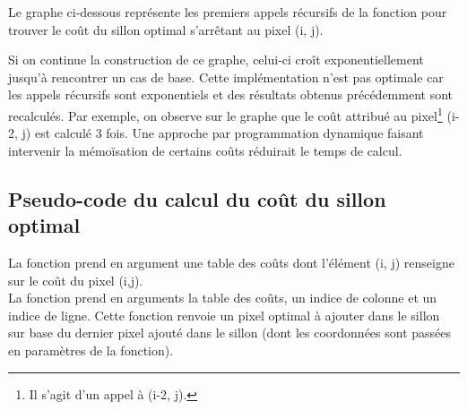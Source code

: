 \documentclass[a4paper, 11pt, oneside]{article}
\begin{document}
Le graphe ci-dessous représente les premiers appels récursifs de la fonction pour trouver le coût du sillon optimal s'arrêtant au pixel (i, j). 

\begin{center}
\end{center}

Si on continue la construction de ce graphe, celui-ci croît exponentiellement jusqu'à rencontrer un cas de base. Cette implémentation n'est pas optimale car les appels récursifs sont exponentiels et des résultats obtenus précédemment sont recalculés. Par exemple, on observe sur le graphe que le coût attribué au pixel\footnote{Il s'agit d'un appel à (i-2, j).} (i-2, j) est calculé 3 fois. Une approche par programmation dynamique faisant intervenir la mémoïsation de certains coûts réduirait le temps de calcul.

\subsection{Pseudo-code du calcul du coût du sillon optimal}

La fonction  prend en argument une table des coûts dont l'élément (i, j) renseigne sur le coût du pixel (i,j).\\La fonction  prend en arguments la table des coûts, un indice de colonne et un indice de ligne. Cette fonction renvoie un pixel optimal à ajouter dans le sillon sur base du dernier pixel ajouté dans le sillon (dont les coordonnées sont passées en paramètres de la fonction).
\end{document}
